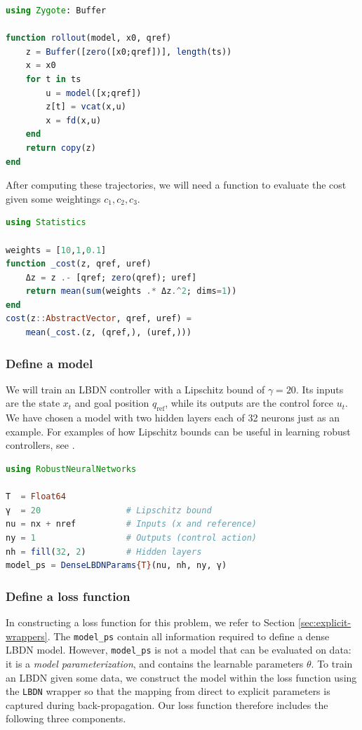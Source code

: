 \begin{lstlisting}[language = Julia]
using Zygote: Buffer

function rollout(model, x0, qref)
    z = Buffer([zero([x0;qref])], length(ts))
    x = x0
    for t in ts
        u = model([x;qref])
        z[t] = vcat(x,u)
        x = fd(x,u)
    end
    return copy(z)
end
\end{lstlisting}

After computing these trajectories, we will need a function to evaluate the cost given some weightings $c_1,c_2,c_3$.
\begin{lstlisting}[language = Julia]
using Statistics

weights = [10,1,0.1]
function _cost(z, qref, uref)
    Δz = z .- [qref; zero(qref); uref]
    return mean(sum(weights .* Δz.^2; dims=1))
end
cost(z::AbstractVector, qref, uref) = 
    mean(_cost.(z, (qref,), (uref,)))
\end{lstlisting}

\subsubsection{Define a model} \label{sec:rl-model}

We will train an LBDN controller with a Lipschitz bound of $\gamma = 20$. Its inputs are the state $x_t$ and goal position $q_\mathrm{ref}$, while its outputs are the control force $u_t$. We have chosen a model with two hidden layers each of 32 neurons just as an example. For examples of how Lipschitz bounds can be useful in learning robust controllers, see \cite{Barbara++2024a,Russo+Proutiere2021}.

\begin{lstlisting}[language = Julia]
using RobustNeuralNetworks

T  = Float64
γ  = 20                 # Lipschitz bound
nu = nx + nref          # Inputs (x and reference)
ny = 1                  # Outputs (control action)
nh = fill(32, 2)        # Hidden layers
model_ps = DenseLBDNParams{T}(nu, nh, ny, γ)
\end{lstlisting}

\subsubsection{Define a loss function} \label{sec:rl-loss}

In constructing a loss function for this problem, we refer to Section \ref{sec:explicit-wrappers}. The \verb|model_ps| contain all information required to define a dense LBDN model. However, \verb|model_ps| is not a model that can be evaluated on data: it is a \textit{model parameterization}, and contains the learnable parameters $\theta$. To train an LBDN given some data, we construct the model within the loss function using the \verb|LBDN| wrapper so that the mapping from direct to explicit parameters is captured during back-propagation. Our loss function therefore includes the following three components.

